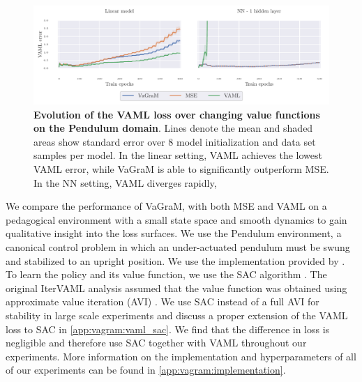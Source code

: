 \begin{figure}[t]
\begin{center}
\includegraphics[width=\linewidth]{figures/vagram/pendulum_joint.pdf}
\end{center}
\caption{\textbf{Evolution of the VAML loss over changing value functions on the Pendulum domain}. Lines denote the mean and shaded areas show standard error over 8 model initialization and data set samples per model. In the linear setting, VAML achieves the lowest VAML error, while VaGraM is able to significantly outperform MSE. In the NN setting, VAML diverges rapidly, }
\label{fig:vagram:iterated_pendulum_training}
\end{figure}

We compare the performance of VaGraM, with both MSE and VAML on a pedagogical environment with a small state space and smooth dynamics to gain qualitative insight into the loss surfaces. 
We use the Pendulum environment, a canonical control problem in which an under-actuated pendulum must be swung and stabilized to an upright position.
We use the implementation provided by \cite{brockman2016openai}.
To learn the policy and its value function, we use the SAC algorithm \parencite{sac}.
The original IterVAML analysis assumed that the value function was obtained using approximate value iteration (AVI) \parencite{gordon1995stable,ernst2005tree,farahmand2010error}. We use SAC instead of a full AVI for stability in large scale experiments and discuss a proper extension of the VAML loss to SAC in \autoref{app:vagram:vaml_sac}. We find that the difference in loss is negligible and therefore use SAC together with VAML throughout our experiments.
More information on the implementation and hyperparameters of all of our experiments can be found in \autoref{app:vagram:implementation}. 

